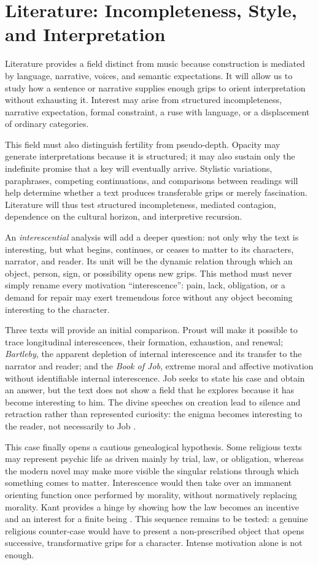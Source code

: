 \documentclass[11pt,a4paper]{article}
\begin{document}
\section{Literature: Incompleteness, Style, and Interpretation}

Literature provides a field distinct from music because construction is
mediated by language, narrative, voices, and semantic expectations. It will
allow us to study how a sentence or narrative supplies enough grips to orient
interpretation without exhausting it. Interest may arise from structured
incompleteness, narrative expectation, formal constraint, a ruse with language,
or a displacement of ordinary categories.

This field must also distinguish fertility from pseudo-depth. Opacity may
generate interpretations because it is structured; it may also sustain only the
indefinite promise that a key will eventually arrive. Stylistic variations,
paraphrases, competing continuations, and comparisons between readings will
help determine whether a text produces transferable grips or merely
fascination. Literature will thus test structured incompleteness, mediated
contagion, dependence on the cultural horizon, and interpretive recursion.

An \emph{interescential} analysis will add a deeper question: not only why the
text is interesting, but what begins, continues, or ceases to matter to its
characters, narrator, and reader. Its unit will be the dynamic relation through
which an object, person, sign, or possibility opens new grips. This method must
never simply rename every motivation ``interescence'': pain, lack, obligation,
or a demand for repair may exert tremendous force without any object becoming
interesting to the character.

Three texts will provide an initial comparison. Proust will make it possible to
trace longitudinal interescences, their formation, exhaustion, and renewal;
\emph{Bartleby}, the apparent depletion of internal interescence and its
transfer to the narrator and reader; and the \emph{Book of Job}, extreme moral
and affective motivation without identifiable internal interescence. Job seeks
to state his case and obtain an answer, but the text does not show a field that
he explores because it has become interesting to him. The divine speeches on
creation lead to silence and retraction rather than represented curiosity: the
enigma becomes interesting to the reader, not necessarily to Job
\parencite{jps1985tanakh}.

This case finally opens a cautious genealogical hypothesis. Some religious
texts may represent psychic life as driven mainly by trial, law, or obligation,
whereas the modern novel may make more visible the singular relations through
which something comes to matter. Interescence would then take over an immanent
orienting function once performed by morality, without normatively replacing
morality. Kant provides a hinge by showing how the law becomes an incentive and
an interest for a finite being \parencite{kant1848moralepratique}. This sequence
remains to be tested: a genuine religious counter-case would have to present a
non-prescribed object that opens successive, transformative grips for a
character. Intense motivation alone is not enough.
\end{document}
